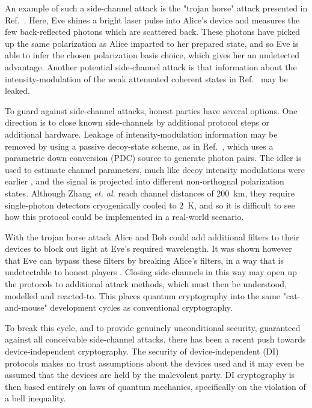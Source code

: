 An example of such a side-channel attack  is the "trojan horse" attack presented in Ref.~\cite{Jain2014}. Here, Eve shines a bright laser pulse into Alice's device and measures the few back-reflected photons which are scattered back. These photons have picked up the same polarization as Alice imparted to her prepared state, and so Eve is able to infer the chosen polarization basis choice, which gives her an undetected advantage. Another potential side-channel attack is that information about the intensity-modulation of the weak attenuated coherent states in Ref.~\cite{Amiri2016, Yin2016c} may be leaked.



To guard against side-channel attacks, honest parties have several options. One direction is to close known side-channels by additional protocol steps or additional hardware. Leakage of intensity-modulation information may be removed by using a passive decoy-state scheme, as in Ref.~\cite{Zhang2018}, which uses a parametric down conversion (PDC) source to generate photon pairs. The idler is used to estimate channel parameters, much like decoy intensity modulations were earlier , and the signal is projected into different non-orthognal polarization states. Although Zhang \emph{et. al.} reach channel distances of $200$~km, they require single-photon detectors cryogenically cooled to $2$~K, and so it is difficult to see how this protocol could be implemented in a real-world scenario.


With the trojan horse attack Alice and Bob could add additional filters to their devices to block out light at Eve's required wavelength. It was shown however that Eve can bypass these filters by breaking Alice's filters, in a way that is undetectable to honest players . Closing side-channels in this way may open up the protocols to additional attack methods, which must then be understood, modelled and reacted-to. This places quantum cryptography into the same "cat-and-mouse" development cycles as conventional cryptography. 

To break this cycle, and to provide genuinely unconditional security, guaranteed against all conceivable side-channel attacks, there has been a recent push towards device-independent cryptography. The security of device-independent (DI) protocols makes no trust assumptions about the devices used and it may even be assumed that the  devices are held by the malevolent party. DI cryptography is then based entirely on laws of quantum mechanics, specifically on the violation of a bell inequality. 


